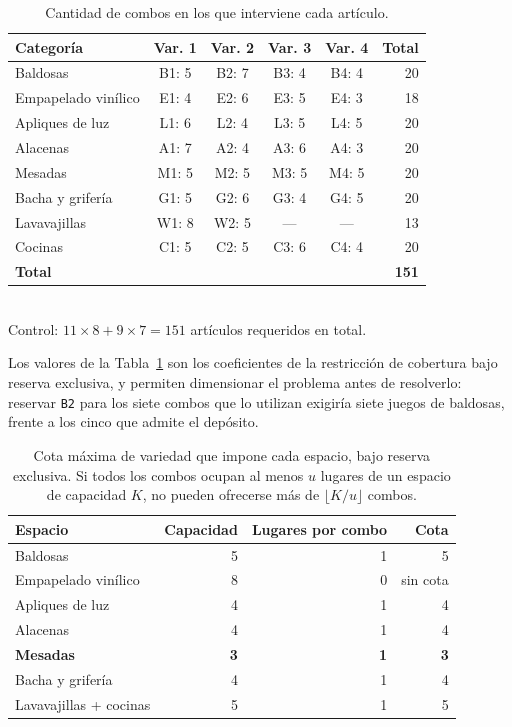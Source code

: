 \documentclass[10pt,a4paper]{article}
\newcommand{\cuello}[1]{\textbf{\textcolor{limita}{#1}}}
\newcommand{\art}[1]{\texttt{#1}}
\begin{document}
\begin{table}[H]
\centering\small
\caption{Cantidad de combos en los que interviene cada artículo.}
\label{tab:apariciones}
\begin{tabular}{lcccc r}
\toprule
\textbf{Categoría} & \textbf{Var. 1} & \textbf{Var. 2} & \textbf{Var. 3} & \textbf{Var. 4} & \textbf{Total} \\
\midrule
Baldosas            & B1: 5 & B2: 7 & B3: 4 & B4: 4 & 20 \\
Empapelado vinílico & E1: 4 & E2: 6 & E3: 5 & E4: 3 & 18 \\
Apliques de luz     & L1: 6 & L2: 4 & L3: 5 & L4: 5 & 20 \\
Alacenas            & A1: 7 & A2: 4 & A3: 6 & A4: 3 & 20 \\
Mesadas             & M1: 5 & M2: 5 & M3: 5 & M4: 5 & 20 \\
Bacha y grifería    & G1: 5 & G2: 6 & G3: 4 & G4: 5 & 20 \\
Lavavajillas        & W1: 8 & W2: 5 & ---   & ---   & 13 \\
Cocinas             & C1: 5 & C2: 5 & C3: 6 & C4: 4 & 20 \\
\midrule
\textbf{Total} & & & & & \textbf{151} \\
\bottomrule
\end{tabular}
\vspace{1mm}\\
\footnotesize Control: $11 \times 8 + 9 \times 7 = 151$ artículos requeridos en
total.
\end{table}

Los valores de la Tabla~\ref{tab:apariciones} son los coeficientes de la
restricción de cobertura bajo reserva exclusiva, y permiten dimensionar el
problema antes de resolverlo: reservar \art{B2} para los siete combos que lo
utilizan exigiría siete juegos de baldosas, frente a los cinco que admite el
depósito.

\begin{table}[H]
\centering\small
\caption{Cota máxima de variedad que impone cada espacio, bajo reserva
exclusiva. Si todos los combos ocupan al menos $u$ lugares de un espacio de
capacidad $K$, no pueden ofrecerse más de $\lfloor K/u \rfloor$ combos.}
\label{tab:cota_trivial}
\begin{tabular}{lrrr}
\toprule
\textbf{Espacio} & \textbf{Capacidad} & \textbf{Lugares por combo} & \textbf{Cota} \\
\midrule
Baldosas               & 5 & 1 & 5 \\
Empapelado vinílico    & 8 & 0 & sin cota \\
Apliques de luz        & 4 & 1 & 4 \\
Alacenas               & 4 & 1 & 4 \\
\cuello{Mesadas}       & \cuello{3} & \cuello{1} & \cuello{3} \\
Bacha y grifería       & 4 & 1 & 4 \\
Lavavajillas + cocinas & 5 & 1 & 5 \\
\bottomrule
\end{tabular}
\end{table}
\end{document}
